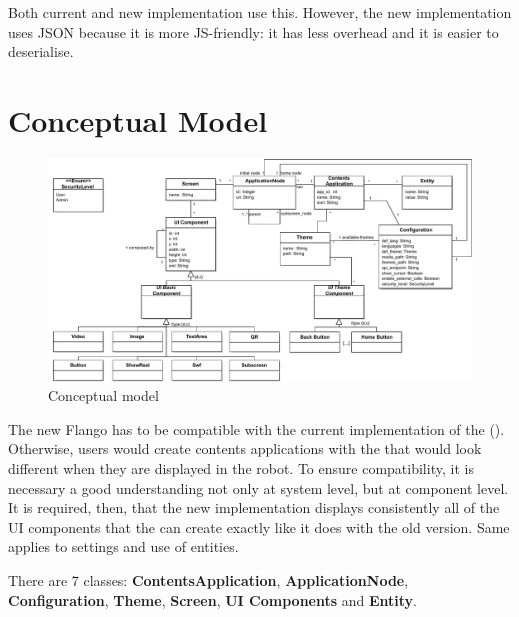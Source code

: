 Both current and new implementation use this.
However, the new implementation uses \ac{JSON} because it is more \ac{JS}-friendly: it has less overhead and it is easier to deserialise.

\section{Conceptual Model}
\begin{figure}   
    \centering
    \includegraphics[width=\textwidth]{figures/specification-conceptual-model}
    \caption{Conceptual model}
    \label{fig:specification-conceptual-model}
\end{figure}

The new Flango \cm has to be compatible with the current implementation of the \se (\flangofe).
Otherwise, users would create contents applications with the \se that would look different when they are displayed in the robot.
To ensure compatibility, it is necessary a good understanding not only at system level, but at component level.
It is required, then, that the new implementation displays consistently all of the \ac{UI} components that the \se can create exactly like it does with the old version. 
Same applies to settings and use of entities.

There are 7 classes: \textbf{ContentsApplication}, \textbf{ApplicationNode}, \textbf{Configuration}, \textbf{Theme}, \textbf{Screen}, \textbf{UI Components} and \textbf{Entity}.

